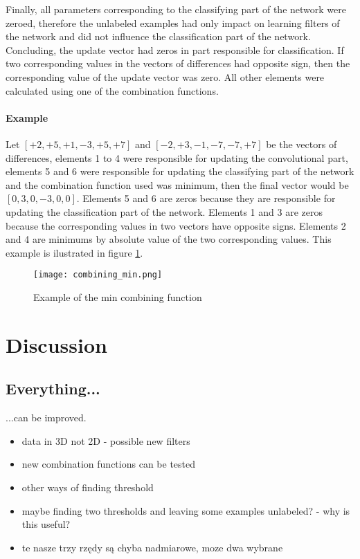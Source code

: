 \documentclass[a4paper,10pt]{report}
\begin{document}
      Finally, all parameters corresponding to the classifying part of the network were zeroed, therefore the unlabeled examples had only impact on learning filters of the network and did not influence the classification part of the network.\\
	
      Concluding, the update vector had zeros in part responsible for classification. If two corresponding values in the vectors of differences had opposite sign, then the corresponding value of the update vector was zero. All other elements were calculated using one of the combination functions.\\
      
      \subsubsection{Example}
      Let $[+2, +5, +1, -3, +5, +7]$ and $[-2, +3, -1, -7, -7, +7]$ be the vectors of differences, elements 1 to 4 were responsible for updating the convolutional part, elements 5 and 6 were responsible for updating the classifying part of the network and the combination function used was minimum, then the final vector would be $[0, 3, 0, -3, 0, 0]$. Elements 5 and 6 are zeros because they are responsible for updating the classification part of the network. Elements 1 and 3 are zeros because the corresponding values in two vectors have opposite signs. Elements 2 and 4 are minimums by absolute value of the two corresponding values. This example is ilustrated in figure \ref{fig:combining}.\\
      
      \begin{figure}[h!]
	  \centering
	  \texttt{[image: combining\_min.png]}
	  \caption{Example of the min combining function}
	  \label{fig:combining}
	\end{figure} 
	
      
     
	
  \chapter{Discussion} %
    \section{Everything...}
      ...can be improved.\\
      \begin{itemize}
	   \item data in 3D not 2D - possible new filters
	   \item new combination functions can be tested
	   \item other ways of finding threshold
	   \item maybe finding two thresholds and leaving some examples unlabeled? - why is this useful?
	   \item te nasze trzy rzędy są chyba nadmiarowe, moze dwa wybrane
      \end{itemize}
      
\end{document}
